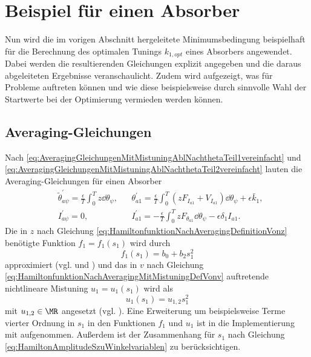 \section{Beispiel für einen Absorber}
\label{sec:Opt:Bsp}

Nun wird die im vorigen Abschnitt hergeleitete Minimumsbedingung beispielhaft 
für die Berechnung des optimalen Tunings $k_{1,opt}$ eines Absorbers angewendet.
Dabei werden die resultierenden Gleichungen explizit angegeben und die daraus abgeleiteten Ergebnisse veranschaulicht.
Zudem wird aufgezeigt, was für Probleme auftreten können und wie diese beispielsweise durch 
sinnvolle Wahl der Startwerte bei der Optimierung vermieden werden können.


\subsection{Averaging-Gleichungen} \label{Opt:Bsp:AveragingGleichungen}
%
%
%
%
Nach \eqref{eq:AveragingGleichungenMitMistuningAblNachthetaTeil1vereinfacht} und 
\eqref{eq:AveragingGleichungenMitMistuningAblNachthetaTeil2vereinfacht} lauten die Averaging-Gleichungen
für einen Absorber  
%
%
%
%
\begin{align}
		& \tilde{\theta}_{a \psi}^\prime = \frac{\epsilon}{T} \int_0^T   z \dd \theta_{\psi},  &  
		& \theta_{a1}^\prime = \frac{\epsilon}{T} \int_0^T   \left(  z F_{I_{a1}} + V_{I_{a1}} \right)  \dd \theta_{\psi}        + \epsilon \bar{k}_1,  	\label{eq:OptBspEinAbsTeil1}\\
		& I_{a \psi}^\prime = 0, &
		& I_{a1}^\prime = - \frac{\epsilon}{T} \int_0^T  z F_{\theta_{a1}}  \dd \theta_{\psi}        - \epsilon \delta_1 I_{a1} .
	\label{eq:OptBspEinAbsTeil2}
\end{align}
%
%
%
Die in $z$ nach Gleichung \eqref{eq:HamiltonfunktionNachAveragingDefinitionVonz} benötigte  Funktion $f_1=f_1(s_1)$ wird durch
\begin{equation}
	f_1(s_1) = b_0 + b_2 s_1^2
	\label{eq:Opt:Bsp:Funktionf1}
\end{equation}
approximiert (vgl.  und \cite{Mayet:Tautochronic}) und das in $v$ nach Gleichung \eqref{eq:HamiltonfunktionNachAveragingMitMistuningDefVonv} 
auftretende nichtlineare Mistuning $u_1=u_1(s_1)$ wird als
\begin{equation}
	u_1(s_1) = u_{1,2} s_1^2 
	\label{eq:Opt:Bsp:MistAnsatz2terOrdn}
\end{equation}
mit $u_{1,2} \in \MR$ angesetzt (vgl. ).
Eine Erweiterung um beispielsweise Terme vierter Ordnung in $s_1$ in den Funktionen $f_1$ und $u_1$ ist in die Implementierung mit aufgenommen.
Außerdem ist der  Zusammenhang für $s_1$ nach 
Gleichung 	\eqref{eq:HamiltonAmplitudeSzuWinkelvariablen} zu berücksichtigen.



